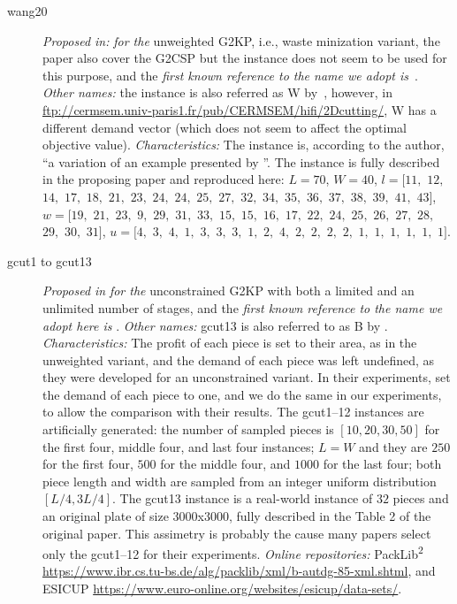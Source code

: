 \documentclass[ppgc,tese,english,formais,babel]{iiufrgs}
\begin{document}
\begin{description}
\item [wang20] \emph{Proposed in:} \citet{wang:1983} \emph{for the} unweighted G2KP, i.e., waste minization variant, the paper also cover the G2CSP but the instance does not seem to be used for this purpose, and the \emph{first known reference to the name we adopt is}~\citet{fekete:1997}. \emph{Other names:} the instance is also referred as W by~\citet{fayard:1998}, however, in \url{ftp://cermsem.univ-paris1.fr/pub/CERMSEM/hifi/2Dcutting/}, W has a different demand vector (which does not seem to affect the optimal objective value). \emph{Characteristics:} The instance is, according to the author, ``a variation of an example presented by \citet{cw:1977}''. The instance is fully described in the proposing paper and reproduced here: \(L = 70\), \(W = 40\), \(l = [11,\) \(12,\) \(14,\) \(17,\) \(18,\) \(21,\) \(23,\) \(24,\) \(24,\) \(25,\) \(27,\) \(32,\) \(34,\) \(35,\) \(36,\) \(37,\) \(38,\) \(39,\) \(41,\) \(43]\), \(w = [19,\) \(21,\) \(23,\) \(9,\) \(29,\) \(31,\) \(33,\) \(15,\) \(15,\) \(16,\) \(17,\) \(22,\) \(24,\) \(25,\) \(26,\) \(27,\) \(28,\) \(29,\) \(30,\) \(31]\), \(u = [4,\) \(3,\) \(4,\) \(1,\) \(3,\) \(3,\) \(3,\) \(1,\) \(2,\) \(4,\) \(2,\) \(2,\) \(2,\) \(2,\) \(1,\) \(1,\) \(1,\) \(1,\) \(1,\) \(1]\).
\item [gcut1 to gcut13] \emph{Proposed in} \citet{beasley:1985:guillotine} \emph{for the} unconstrained G2KP with both a limited and an unlimited number of stages, and the \emph{first known reference to the name we adopt here is} \citet{martello:1998}. \emph{Other names:} gcut13 is also referred to as B by \citet{fekete:1997}. \emph{Characteristics: } The profit of each piece is set to their area, as in the unweighted variant, and the demand of each piece was left undefined, as they were developed for an unconstrained variant. In their experiments, \citet{furini:2016} set the demand of each piece to one, and we do the same in our experiments, to allow the comparison with their results. The gcut1--12 instances are artificially generated: the number of sampled pieces is \([10, 20, 30, 50]\) for the first four, middle four, and last four instances; \(L = W\) and they are \(250\) for the first four, \(500\) for the middle four, and \(1000\) for the last four; both piece length and width are sampled from an integer uniform distribution~\([L/4, 3L/4]\). The gcut13 instance is a real-world instance of \(32\) pieces and an original plate of size \(3000\)x\(3000\), fully described in the Table 2 of the original paper. This assimetry is probably the cause many papers select only the gcut1--12 for their experiments. \emph{Online repositories: } PackLib\textsuperscript{2} \url{https://www.ibr.cs.tu-bs.de/alg/packlib/xml/b-autdg-85-xml.shtml}, and ESICUP \url{https://www.euro-online.org/websites/esicup/data-sets/}.

\end{description}
\end{document}
